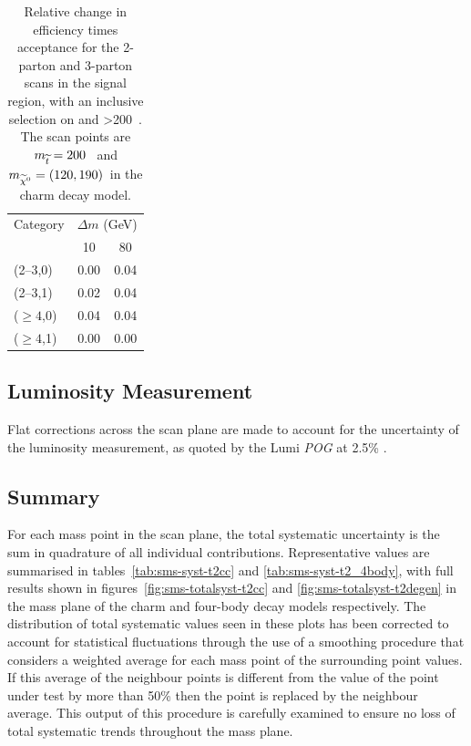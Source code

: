 \begin{table}[!h]
  \caption{Relative change in efficiency times acceptance for the
    2-parton and 3-parton scans in the signal region, with an inclusive 
    selection on \nb and \HT>200~\gev. The scan points are $m_{\widetilde{t}} = 200$~\gev 
    and $m_{\widetilde{\chi}^{0}} = (120, 190)$~\gev in the charm decay model.}
  \label{tab:sms-t2cc-2v3part}
  \centering
  \small
  \begin{tabular}{ lcc }
    \hline
    \hline
    Category     & \multicolumn{2}{c}{$\Delta m$ (GeV)} \\
    \cline{2-3}
                 & 10   & 80                            \\
    \hline
    (2--3,0)     & 0.00 & 0.04                          \\
    (2--3,1)     & 0.02 & 0.04                          \\
    ($\geq 4$,0) & 0.04 & 0.04                          \\
    ($\geq 4$,1) & 0.00 & 0.00                          \\
    \hline
    \hline
  \end{tabular}
\end{table}

\subsection{Luminosity Measurement}
Flat corrections across the scan plane are made to account for the uncertainty 
of the luminosity measurement, as quoted by the Lumi \emph{POG} at 2.5\%
\cite{CMS:2013gfa}.

\subsection{Summary}
For each mass point in the scan plane, the total systematic uncertainty is the sum in 
quadrature of all individual contributions. Representative values are summarised
in tables~\ref{tab:sms-syst-t2cc} and \ref{tab:sms-syst-t2_4body}, with full
results shown in figures~\ref{fig:sms-totalsyst-t2cc} and
\ref{fig:sms-totalsyst-t2degen} in the mass plane of the charm and four-body
decay models respectively. The distribution of total systematic values seen
in these plots has been corrected to account for statistical fluctuations through
the use of a smoothing procedure that considers a weighted average
for each mass point of the surrounding point values. If this average of the neighbour points
is different from the value of the point under test by more than 50\% then the
point is replaced by the neighbour average. This output of this procedure is
carefully examined to ensure no loss of total systematic trends throughout the
mass plane.

